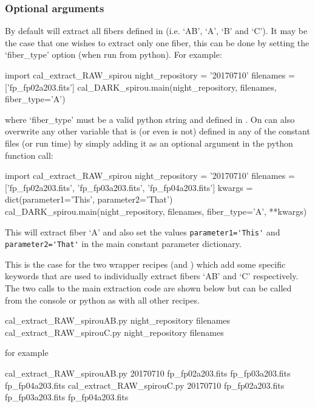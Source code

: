 \subsubsection{Optional arguments}

By default \calextractRAW will extract all fibers defined in  (i.e. `AB', `A', `B' and `C'). It may be the case that one wishes to extract only one fiber, this can be done by setting the `fiber\_type' option (when run from python). For example:
\begin{pythonbox}
import cal_extract_RAW_spirou
night_repository = '20170710'
filenames = ['fp_fp02a203.fits']
cal_DARK_spirou.main(night_repository, filenames, fiber_type='A')
\end{pythonbox}
\noindent where `fiber\_type' must be a valid python string and defined in . On can also overwrite any other variable that is (or even is not) defined in any of the constant files (or run time) by simply adding it as an optional argument in the python function call:
\begin{pythonbox}
import cal_extract_RAW_spirou
night_repository = '20170710'
filenames = ['fp_fp02a203.fits', 'fp_fp03a203.fits', 'fp_fp04a203.fits']
kwargs = dict(parameter1='This', parameter2='That')
cal_DARK_spirou.main(night_repository, filenames, fiber_type='A', **kwargs)
\end{pythonbox}
\begin{note}
This will extract fiber `A' and also set the values \lstinline[style=pythoninline]|parameter1='This'| and \lstinline[style=pythoninline]|parameter2='That'| in the main constant parameter dictionary.
\end{note}
\noindent This is the case for the two wrapper recipes (\calextractRAWAB and \calextractRAWC) which add some specific keywords that are used to individually extract fibers `AB' and `C' respectively. The two calls to the main extraction code are shown below but can be called from the console or python as with all other recipes.
\begin{cmdbox}
cal_extract_RAW_spirouAB.py night_repository filenames
cal_extract_RAW_spirouC.py night_repository filenames
\end{cmdbox}
\noindent for example
\begin{cmdbox}[title={example}]
cal_extract_RAW_spirouAB.py 20170710 fp_fp02a203.fits fp_fp03a203.fits fp_fp04a203.fits
cal_extract_RAW_spirouC.py 20170710 fp_fp02a203.fits fp_fp03a203.fits fp_fp04a203.fits
\end{cmdbox}
